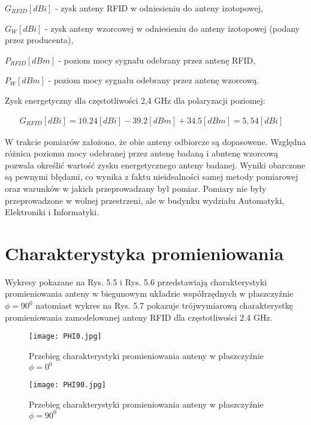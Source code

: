 \noindent
\newline$G_{RFID}[dBi]$ - zysk anteny RFID w odniesieniu do anteny izotopowej, 


\noindent
\newline $G_{W}[dBi]$ - zysk anteny wzorcowej w odniesieniu do anteny izotopowej (podany przez producenta),

\noindent
\newline $P_{RFID}[dBm]$ - poziom mocy sygnału odebrany przez antenę RFID,


\noindent
\newline $P_W[dBm]$ - poziom mocy sygnału odebrany przez antenę wzorcową.

\noindent
\newline Zysk energetyczny dla częstotliwości 2,4 GHz dla polaryzacji poziomej:

\begin{align}
G_{RFID}[dBi] = 10.24[dBi] - 39.2[dBm] + 34.5[dBm] = 5,54[dBi]
\quad
\end{align}




W trakcie pomiarów założono, że obie anteny odbiorcze są dopasowene. Względna różnica poziomu mocy odebranej przez antenę badaną i abntenę wzorcową pozwala określić wartość zysku energetycznego anteny badanej. Wyniki obarczone są pewnymi błędami, co wynika z faktu nieidealności samej metody pomiarowej oraz warunków w jakich przeprowadzany był pomiar. Pomiary nie były przeprowadzone w wolnej przestrzeni, ale w budynku wydziału Automatyki, Elektroniki i Informatyki.

\newpage
\section{Charakterystyka promieniowania}
Wykresy pokazane na Rys. 5.5 i Rys. 5.6 przedstawiają charakterystyki promieniowania anteny w biegunowym układzie współrzędnych w płaszczyźnie $\phi = 90^{0}$ natomiast wykres na Rys. 5.7 pokazuje trójwymiarową charakterystkę promieniowania zamodelowanej anteny RFID dla częstotliwości 2.4 GHz.

\begin{figure}[h!]
\centering
	\texttt{[image: PHI0.jpg]}
	\caption{Przebieg charakterystyki promieniowania anteny w płaszczyźnie $\phi = 0^{0}$}
\end{figure}

\newpage
\begin{figure}[h!]
\centering
	\texttt{[image: PHI90.jpg]}
	\caption{Przebieg charakterystyki promieniowania anteny w płaszczyźnie $\phi = 90^{0}$}
\end{figure}

